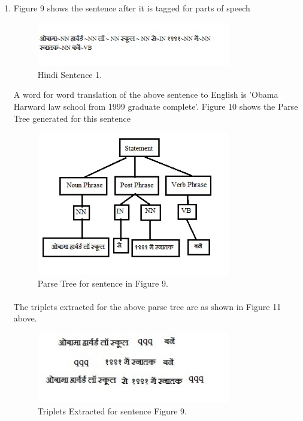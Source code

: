 \begin{enumerate}
\item  Figure 9 shows the sentence after it is tagged for parts of speech

\begin{figure}[htb]
\centering
\includegraphics[width=0.8\textwidth]{images/sentence_testcase1.jpg}
\caption{Hindi Sentence 1.} 
\label{fig:sentence_testcase1}
\end{figure}

A word for word translation of the above sentence to English is 'Obama Harward law school from 1999 graduate complete'. Figure 10 shows the Parse Tree generated for this sentence 

\begin{figure}[htb]
\centering
\includegraphics[width=0.8\textwidth]{images/standalone_testcase.jpg}
\caption{Parse Tree for sentence in Figure 9.} 
\label{fig:standalone_testcase}
\end{figure}

\paragraph{}
The triplets extracted for the above parse tree are as shown in Figure 11 above.

\begin{figure}[htb]
\centering
\includegraphics[width=0.8\textwidth]{images/triplet_standalone.jpg}
\caption{Triplets Extracted for sentence Figure 9.} 
\label{fig:triplet_standalone}
\end{figure}


\end{enumerate}
